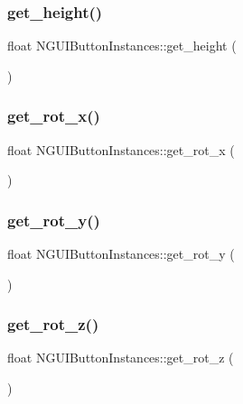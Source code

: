 \subsubsection{\texorpdfstring{get\+\_\+height()}{get\_height()}}
{\footnotesize\ttfamily float N\+G\+U\+I\+Button\+Instances\+::get\+\_\+height (\begin{DoxyParamCaption}{ }\end{DoxyParamCaption})}

\hypertarget{class_n_g_u_i_button_instances_a7767b8fe0829cbb92a01a242c0844f35}{}\label{class_n_g_u_i_button_instances_a7767b8fe0829cbb92a01a242c0844f35} 
\subsubsection{\texorpdfstring{get\+\_\+rot\+\_\+x()}{get\_rot\_x()}}
{\footnotesize\ttfamily float N\+G\+U\+I\+Button\+Instances\+::get\+\_\+rot\+\_\+x (\begin{DoxyParamCaption}{ }\end{DoxyParamCaption})}

\hypertarget{class_n_g_u_i_button_instances_a49ed95cd211b3d19600d0be8ff8de29b}{}\label{class_n_g_u_i_button_instances_a49ed95cd211b3d19600d0be8ff8de29b} 
\subsubsection{\texorpdfstring{get\+\_\+rot\+\_\+y()}{get\_rot\_y()}}
{\footnotesize\ttfamily float N\+G\+U\+I\+Button\+Instances\+::get\+\_\+rot\+\_\+y (\begin{DoxyParamCaption}{ }\end{DoxyParamCaption})}

\hypertarget{class_n_g_u_i_button_instances_afba02dfb514b660cb15663ffbe1fc718}{}\label{class_n_g_u_i_button_instances_afba02dfb514b660cb15663ffbe1fc718} 
\subsubsection{\texorpdfstring{get\+\_\+rot\+\_\+z()}{get\_rot\_z()}}
{\footnotesize\ttfamily float N\+G\+U\+I\+Button\+Instances\+::get\+\_\+rot\+\_\+z (\begin{DoxyParamCaption}{ }\end{DoxyParamCaption})}

